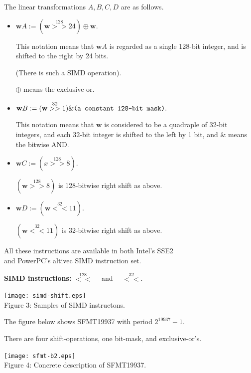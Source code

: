\documentclass[a4j,12pt,landscape]{jarticle}
\def\bw{{{\mathbf w}}}
\begin{document}
The linear transformations $A,B,C,D$ are as follows.
\begin{itemize}
\item 
$\bw A := (\bw \stackrel{128}{>>} 24) \oplus \bw.$

This notation means that $\bw A$ is regarded
as a single 128-bit integer, and 
is shifted to the right by 24 bits.

(There is such a SIMD operation).

$\oplus$ means the exclusive-or.

\item
$\bw B := (\bw \stackrel{32}{>>} 1) \& \mbox{\tt (a constant 128-bit mask)}.$

This notation means that $\bw$ is considered to be 
a quadraple of $32$-bit integers, and
each $32$-bit integer is shifted to the left by 1 bit,
and $\&$ means the bitwise AND. 

\newpage

\item 
$\bw C := (x \stackrel{128}{>>} 8).$

$(\bw \stackrel{128}{>>} 8)$ is 128-bitwise right shift as above.

\item
$\bw D := (\bw \stackrel{32}{<<} 11).$

$(\bw \stackrel{32}{<<} 11)$ is 32-bitwise right shift as above.

\end{itemize}
All these instructions are available in 
both Intel's SSE2 \\
and PowerPC's altivec SIMD instruction set.

\newpage
{\bf SIMD instructions:} 
$\stackrel{128}{<<}\quad$ and $\quad\stackrel{32}{<<}$.
\begin{center}
\texttt{[image: simd-shift.eps]}
\\
Figure 3: Samples of SIMD instructons.
\end{center}

\newpage
The figure below shows SFMT19937 with period $2^{19937}-1$.

There are four shift-operations, one bit-mask, and exclusive-or's.

\begin{center}
\texttt{[image: sfmt-b2.eps]}
\\
Figure 4: Concrete description of SFMT19937.
\end{center}
\end{document}
